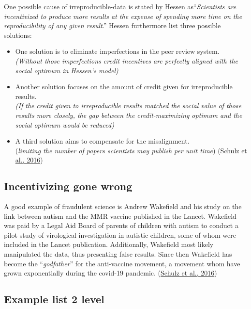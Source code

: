 \documentclass[
  11pt,
]{article}
\begin{document}
One possible cause of irreproducible-data is stated by Hessen
as``\emph{Scientists are incentivized to produce more results at the
expense of spending more time on the reproducibility of any given
result}.'' Hessen furthermore list three possible solutions:

\begin{itemize}
\item
  One solution is to eliminate imperfections in the peer review
  system.\\
  \emph{(Without those imperfections credit incentives are perfectly
  aligned with the social optimum in Hessen`s model)}
\item
  Another solution focuses on the amount of credit given for
  irreproducible results.\\
  \emph{(If the credit given to irreproducible results matched the
  social value of those results more closely, the gap between the
  credit-maximizing optimum and the social optimum would be reduced)}
\item
  A third solution aims to compensate for the misalignment.\\
  (\emph{limiting the number of papers scientists may publish per unit
  time}) (\protect\hyperlink{ref-schulz2016}{Schulz et al., 2016})
\end{itemize}

\hypertarget{incentivizing-gone-wrong}{%
\subsection{Incentivizing gone wrong}\label{incentivizing-gone-wrong}}

A good example of fraudulent science is Andrew Wakefield and his study
on the link between autism and the MMR vaccine published in the Lancet.
Wakefield was paid by a Legal Aid Board of parents of children with
autism to conduct a pilot study of virological investigation in autistic
children, some of whom were included in the Lancet publication.
Additionally, Wakefield most likely manipulated the data, thus
presenting false results. Since then Wakefield has become the
``\emph{godfather}'' for the anti-vaccine movement, a movement whom have
grown exponentially during the covid-19 pandemic.
(\protect\hyperlink{ref-schulz2016}{Schulz et al., 2016})

\hypertarget{example-list-2-level}{%
\subsection{Example list 2 level}\label{example-list-2-level}}
\end{document}
